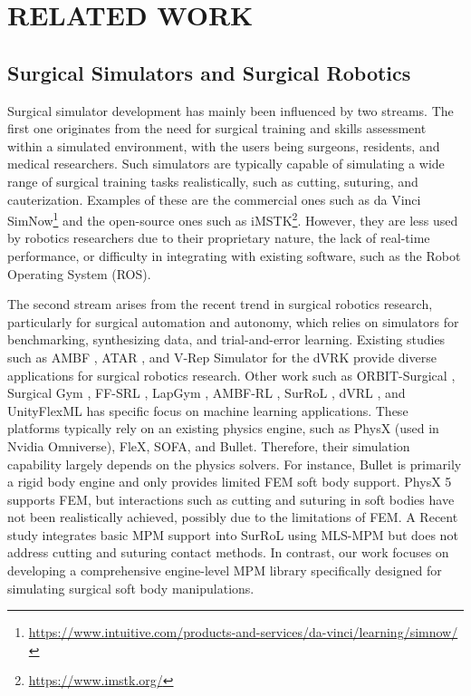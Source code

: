 \section{RELATED WORK}
\subsection{Surgical Simulators and Surgical Robotics}
Surgical simulator development has mainly been influenced by two streams. The first one originates from the need for surgical training and skills assessment within a simulated environment, with the users being surgeons, residents, and medical researchers.
Such simulators are typically capable of simulating a wide range of surgical training tasks realistically, such as cutting, suturing, and cauterization.
Examples of these are the commercial ones such as da Vinci SimNow\footnote{\url{https://www.intuitive.com/products-and-services/da-vinci/learning/simnow/}}
and the open-source ones such as iMSTK\footnote{\url{https://www.imstk.org/}}.
However, they are less used by robotics researchers due to their proprietary nature, the lack of real-time performance, or difficulty in integrating with existing software, such as the Robot Operating System (ROS).

The second stream arises from the recent trend in surgical robotics research, particularly for surgical automation and autonomy, which relies on simulators for benchmarking, synthesizing data, and trial-and-error learning.
Existing studies such as AMBF \cite{munawar2019RealTimeDynamic}, ATAR \cite{enayati2018RoboticAssistanceasNeeded}, and V-Rep Simulator for the dVRK \cite{fontanelli2018VREPSimulator} provide diverse applications for surgical robotics research.
Other work such as ORBIT-Surgical \cite{yu2024OrbitSurgicalOpenSimulationa}, Surgical Gym \cite{schmidgall2024SurgicalGym}, FF-SRL \cite{dallalba2024FFSRLHigh}, LapGym \cite{scheikl2023LapGymOpen}, AMBF-RL \cite{varier2022AMBFRLRealtime}, SurRoL \cite{xu2021SurRoLOpensource}, dVRL \cite{richter2020OpenSourcedReinforcement}, and UnityFlexML \cite{tagliabue2020SoftTissue} has specific focus on machine learning applications.
These platforms typically rely on an existing physics engine, such as PhysX (used in Nvidia Omniverse), FleX, SOFA, and Bullet.
Therefore, their simulation capability largely depends on the physics solvers. For instance, Bullet is primarily a rigid body engine and only provides limited FEM soft body support.
PhysX 5 supports FEM, but interactions such as cutting and suturing in soft bodies have not been realistically achieved, possibly due to the limitations of FEM.
A Recent study \cite{yang2024efficient} integrates basic MPM support into SurRoL using MLS-MPM but does not address cutting and suturing contact methods.
In contrast, our work focuses on developing a comprehensive engine-level MPM library specifically designed for simulating surgical soft body manipulations.

